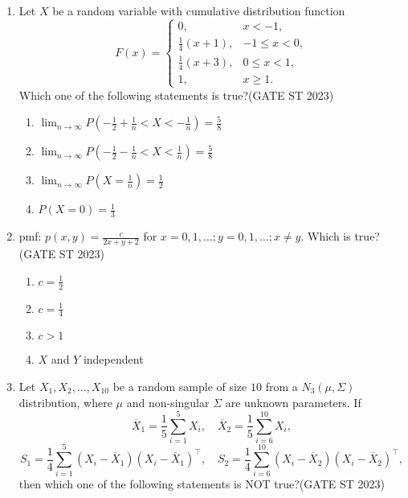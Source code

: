 \documentclass[journal]{IEEEtran}
\begin{document}
\begin{enumerate}[label=\textbf{Q.\arabic*.}, start=1, align=left, itemsep=2em]
\begin{enumerate}[label=\textbf{Q.\arabic*.}, start=11, align=left, itemsep=2em]
\item Let $X$ be a random variable with cumulative distribution function
\[
F(x) =
\begin{cases}
0, & x < -1, \\[4pt]
\frac14(x+1), & -1 \le x < 0, \\[4pt]
\frac14(x+3), & 0 \le x < 1, \\[4pt]
1, & x \ge 1.
\end{cases}
\]
Which one of the following statements is true?\hfill(GATE ST 2023)
\begin{enumerate}[label=(\Alph*)]
    \item $\displaystyle \lim_{n \to \infty} P\!\left(-\frac12 + \frac1n < X < -\frac1n\right) = \frac{5}{8}$
    \item $\displaystyle \lim_{n \to \infty} P\!\left(-\frac12 - \frac1n < X < \frac1n\right) = \frac{5}{8}$
    \item $\displaystyle \lim_{n \to \infty} P\!\left(X = \frac1n\right) = \frac12$
    \item $P(X = 0) = \frac13$
\end{enumerate}

\item pmf: $p(x,y) = \frac{c}{2x+y+2}$ for $x=0,1,\dots; y=0,1,\dots; x\ne y$. Which is true?\hfill(GATE ST 2023)
\begin{enumerate}[label=(\Alph*)]
\item $c = \frac12$
\item $c = \frac14$
\item $c > 1$
\item $X$ and $Y$ independent
\end{enumerate}

\item Let $X_1, X_2, \dots, X_{10}$ be a random sample of size $10$ from a $N_3(\mu,\Sigma)$
distribution, where $\mu$ and non-singular $\Sigma$ are unknown parameters. If  
\[
\overline{X}_1 = \frac{1}{5} \sum_{i=1}^5 X_i, 
\quad
\overline{X}_2 = \frac{1}{5} \sum_{i=6}^{10} X_i,
\]
\[
S_1 = \frac{1}{4} \sum_{i=1}^5 (X_i - \overline{X}_1)(X_i - \overline{X}_1)^\top, 
\quad
S_2 = \frac{1}{4} \sum_{i=6}^{10} (X_i - \overline{X}_2)(X_i - \overline{X}_2)^\top,
\]
then which one of the following statements is NOT true?\hfill(GATE ST 2023)


\end{enumerate}
\end{enumerate}
\end{document}
